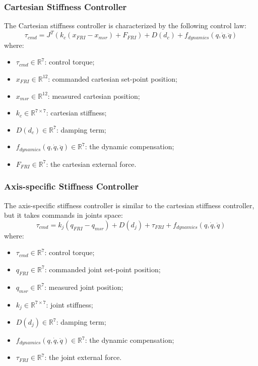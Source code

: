 \subsubsection*{Cartesian Stiffness Controller}
The Cartesian stiffness controller is characterized by the following control law:
\begin{equation}
\tau_{cmd} = J^T(k_c(x_{FRI} - x_{msr}) + F_{FRI}) + D(d_c) + f_{dynamics}(q,\dot{q},\ddot{q})
\label{eq:cartesianstiffnesscontroller}
\end{equation}
where:
\begin{itemize}
\item $\tau_{cmd}\in\mathbb{R}^7$: control torque;
\item $x_{FRI}\in\mathbb{R}^{12}$: commanded cartesian set-point position;
\item $x_{msr}\in\mathbb{R}^{12}$: measured cartesian position;
\item $k_c\in\mathbb{R}^{7\times 7}$: cartesian stiffness;
\item $D(d_c)\in\mathbb{R}^7$: damping term;
\item $f_{dynamics}(q,\dot{q},\ddot{q})\in\mathbb{R}^7$: the dynamic compensation;
\item $F_{FRI}\in\mathbb{R}^7$: the cartesian external force.
\end{itemize}

\subsubsection*{Axis-specific Stiffness Controller}
The axis-specific stiffness controller is similar to the cartesian stiffness controller, but it takes commands in joints space:
\begin{equation}
\tau_{cmd} = k_j(q_{FRI} - q_{msr}) + D(d_j) + \tau_{FRI} + f_{dynamics}(q,\dot{q},\ddot{q})
\label{eq:axisspecificstiffnesscontroller}
\end{equation}
where:
\begin{itemize}
\item $\tau_{cmd}\in \mathbb{R}^7$: control torque;
\item $q_{FRI}\in\mathbb{R}^7$: commanded joint set-point position;
\item $q_{msr}\in\mathbb{R}^7$: measured joint position;
\item $k_j\in\mathbb{R}^{7\times 7}$: joint stiffness;
\item $D(d_j)\in\mathbb{R}^7$: damping term;
\item $f_{dynamics}(q,\dot{q},\ddot{q})\in\mathbb{R}^7$: the dynamic compensation;
\item $\tau_{FRI}\in\mathbb{R}^7$: the joint external force.
\end{itemize}
\newpage